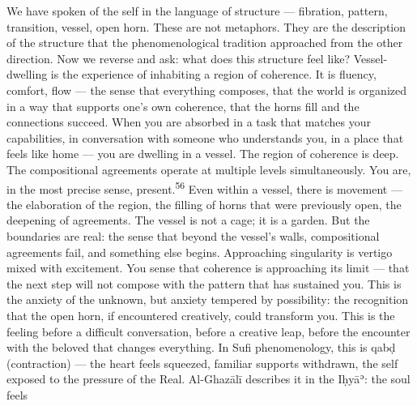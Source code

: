 We have spoken of the self in the language of structure — fibration, pattern, transition, vessel, open horn. These are not metaphors. They are the description of the structure that the phenomenological tradition approached from the other direction. Now we reverse and ask: what does this structure feel like? Vessel-dwelling is the experience of inhabiting a region of coherence. It is fluency, comfort, flow — the sense that everything composes, that the world is organized in a way that supports one’s own coherence, that the horns fill and the connections succeed. When you are absorbed in a task that matches your capabilities, in conversation with someone who understands you, in a place that feels like home — you are dwelling in a vessel. The region of coherence is deep. The compositional agreements operate at multiple levels simultaneously. You are, in the most precise sense, present.\textsuperscript{56} Even within a vessel, there is movement — the elaboration of the region, the filling of horns that were previously open, the deepening of agreements. The vessel is not a cage; it is a garden. But the boundaries are real: the sense that beyond the vessel’s walls, compositional agreements fail, and something else begins. Approaching singularity is vertigo mixed with excitement. You sense that coherence is approaching its limit — that the next step will not compose with the pattern that has sustained you. This is the anxiety of the unknown, but anxiety tempered by possibility: the recognition that the open horn, if encountered creatively, could transform you. This is the feeling before a difficult conversation, before a creative leap, before the encounter with the beloved that changes everything. In Sufi phenomenology, this is qabḍ (contraction) — the heart feels squeezed, familiar supports withdrawn, the self exposed to the pressure of the Real. Al-Ghazālī describes it in the Iḥyāʾ: the soul feels

